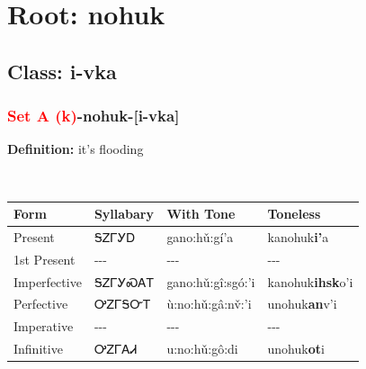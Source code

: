\needspace{4in}
\section*{Root: nohuk}
\nopagebreak
{}
\needspace{3in}
\subsection*{Class: i-vka}
\nopagebreak
\needspace{2in}
\subsubsection*{\textcolor{Red}{Set A (k)}{-}\textbf{nohuk}{-}[i-vka]}
\nopagebreak
\textbf{Definition: } it{\textquoteright}s flooding
\\[0.5em]
\begin{tabularx}{\textwidth}{l X X X}%
\toprule%
\textbf{Form}&\textbf{Syllabary}&\textbf{With Tone}&\textbf{Toneless}\\%
\midrule%
Present&ᎦᏃᎱᎩᎠ&gano:hǔ:gí’a&kanohuk\textbf{i'}a\\%
1st Present&{-}{-}{-}&{-}{-}{-}&{-}{-}{-}\\%
Imperfective&ᎦᏃᎱᎩᏍᎪᎢ&gano:hǔ:gî:sgó:’i&kanohuk\textbf{ihsk}o'i\\%
Perfective&ᎤᏃᎱᎦᏅᎢ&ù:no:hǔ:gâ:nv̌:’i&unohuk\textbf{an}v'i\\%
Imperative&{-}{-}{-}&{-}{-}{-}&{-}{-}{-}\\%
Infinitive&ᎤᏃᎱᎪᏗ&u:no:hǔ:gô:di&unohuk\textbf{ot}i\\%
\bottomrule%
\end{tabularx}
\\[1em]